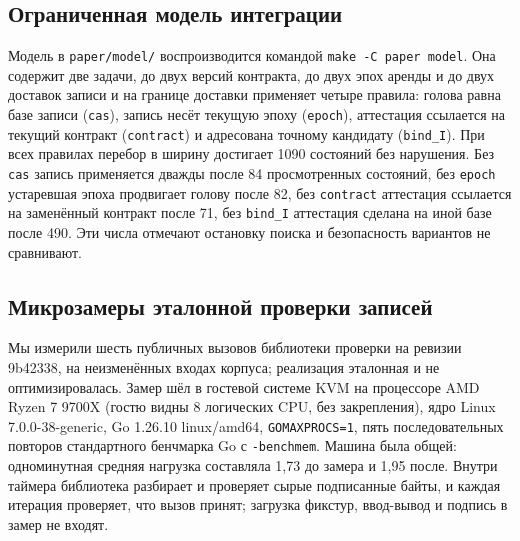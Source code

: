 \documentclass[10pt,a4paper]{article}
\begin{document}
\subsection{Ограниченная модель интеграции}

Модель в \texttt{paper/model/} воспроизводится командой \texttt{make -C paper model}. Она содержит две задачи, до двух версий контракта, до двух эпох аренды и до двух доставок записи и на границе доставки применяет четыре правила: голова равна базе записи (\texttt{cas}), запись несёт текущую эпоху (\texttt{epoch}), аттестация ссылается на текущий контракт (\texttt{contract}) и адресована точному кандидату (\texttt{bind\_I}). При всех правилах перебор в ширину достигает 1090 состояний без нарушения. Без \texttt{cas} запись применяется дважды после 84 просмотренных состояний, без \texttt{epoch} устаревшая эпоха продвигает голову после 82, без \texttt{contract} аттестация ссылается на заменённый контракт после 71, без \texttt{bind\_I} аттестация сделана на иной базе после 490. Эти числа отмечают остановку поиска и безопасность вариантов не сравнивают.

\subsection{Микрозамеры эталонной проверки записей}

Мы измерили шесть публичных вызовов библиотеки проверки на ревизии 9b42338, на неизменённых входах корпуса; реализация эталонная и не оптимизировалась. Замер шёл в гостевой системе KVM на процессоре AMD Ryzen 7 9700X (гостю видны 8 логических CPU, без закрепления), ядро Linux 7.0.0-38-generic, Go 1.26.10 linux/amd64, \texttt{GOMAXPROCS=1}, пять последовательных повторов стандартного бенчмарка Go с \texttt{-benchmem}. Машина была общей: одноминутная средняя нагрузка составляла 1,73 до замера и 1,95 после. Внутри таймера библиотека разбирает и проверяет сырые подписанные байты, и каждая итерация проверяет, что вызов принят; загрузка фикстур, ввод-вывод и подпись в замер не входят.
\end{document}
